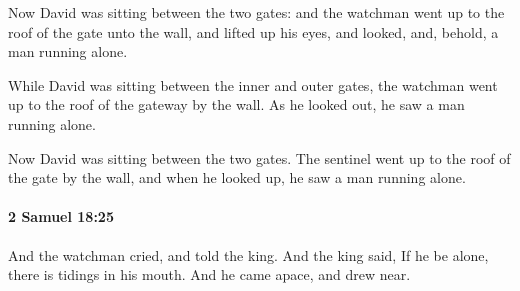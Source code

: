 			\begin{versebox}
					\item[BHS] 
					\item[ASV] Now David was sitting between the two gates: and the watchman went up to the roof of the gate unto the wall, and lifted up his eyes, and looked, and, behold, a man running alone.
					\item[NIV] While David was sitting between the inner and outer gates, the watchman went up to the roof of the gateway by the wall. As he looked out, he saw a man running alone.
					\item[NRSV] Now David was sitting between the two gates. The sentinel went up to the roof of the gate by the wall, and when he looked up, he saw a man running alone.
			\end{versebox}

		\paragraph{2 Samuel 18:25} %
			\label{2SAMUEL-18-25}

			And the watchman cried, and told the king. And the king said, If he be alone, there is tidings in his mouth. And he came apace, and drew near.

